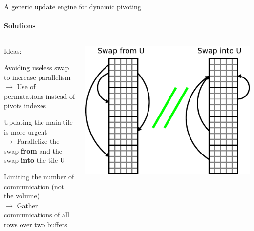 \begin{frame}{A generic update engine for dynamic pivoting}
\framesubtitle{Solutions}
\begin{columns}
\begin{column}{.60\textwidth}
Ideas:
\begin{itemize}
{
\item Avoiding useless swap to increase parallelism\\
$\rightarrow$ Use of permutations instead of pivots indexes}
\item Updating the main tile is more urgent\\
$\rightarrow$ Parallelize the swap \textbf{from} and the swap \textbf{into} the tile U
\item Limiting the number of communication (not the volume)\\
$\rightarrow$ Gather communications of all rows over two buffers
\end{itemize}
\end{column}
\begin{column}{.40\textwidth}
\begin{center}
\includegraphics[scale=0.3]{parswap.pdf}
\end{center}
\end{column}
\end{columns}
\end{frame}

